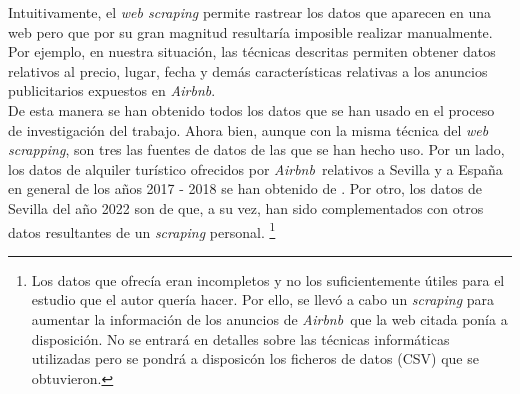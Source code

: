 \documentclass[a4paper]{article}
\newcommand*{\airbnb}{\textit{Airbnb}}
\newcommand*{\webscrapping}{\textit{web scrapping}}
\begin{document}
    \newpage 

        \noindent
        Intuitivamente, el \textit{web scraping} permite rastrear los datos que aparecen 
        en una web pero que por su gran magnitud resultaría imposible realizar manualmente. Por ejemplo, en nuestra situación, las técnicas descritas 
        permiten obtener datos relativos al precio, lugar, fecha y demás características relativas a los anuncios publicitarios expuestos en \airbnb. \\

        \noindent
        De esta manera se han obtenido todos los datos que se han usado en el proceso de investigación del trabajo. Ahora bien, aunque con la misma técnica
        del \webscrapping, son tres las fuentes de datos de las que se han hecho uso. Por un lado, los datos de alquiler turístico ofrecidos por 
        \airbnb \  relativos a Sevilla y a España en general de los años 2017 - 2018 se han obtenido de \cite{datahippo}. Por otro, los datos 
        de Sevilla del año 2022 son de \cite{insideairbnb} que, a su vez, han sido complementados con otros datos resultantes de un \textit{scraping} personal.
        \footnote{Los datos que ofrecía \cite{insideairbnb} eran incompletos y no los suficientemente útiles para el estudio que el autor quería hacer. Por ello,
        se llevó a cabo un \textit{scraping} para aumentar la información de los anuncios de \airbnb \ que la web citada ponía a disposición. No se 
        entrará en detalles sobre las técnicas informáticas utilizadas pero se pondrá a disposicón los ficheros de datos (CSV) que se obtuvieron.} 
\end{document}
